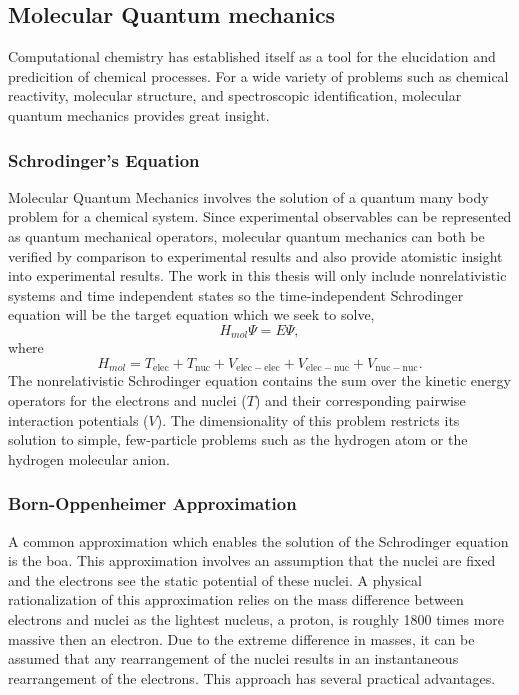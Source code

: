 \subsection{Molecular Quantum mechanics}
Computational chemistry has established itself as a tool for the elucidation and predicition of chemical processes.
For a wide variety of problems such as chemical reactivity, molecular structure, and spectroscopic identification, molecular quantum mechanics provides great insight.

\subsubsection{Schrodinger's Equation}
Molecular Quantum Mechanics  involves the solution of a quantum many body problem for a chemical system. Since experimental observables can be represented as quantum mechanical operators, molecular quantum mechanics can both be verified by comparison to experimental results and also provide atomistic insight into experimental results.
The work in this thesis will only include nonrelativistic systems and time independent states so the time-independent Schrodinger equation will be the target equation which we seek to solve,
\begin{equation}
H_{mol} \Psi = E \Psi,
\end{equation}
where
\begin{equation}
H_{mol} = T_{\mathrm{elec}} + T_{\mathrm{nuc}} + V_{\mathrm{elec-elec}} + V_{\mathrm{elec-nuc}} + V_{\mathrm{nuc-nuc}}.
\end{equation}
The nonrelativistic Schrodinger equation contains the sum over the kinetic energy operators for the electrons and nuclei ($T$) and their corresponding pairwise interaction potentials ($V$).
The dimensionality of this problem restricts its solution to simple, few-particle problems such as the hydrogen atom or the hydrogen molecular anion.

\subsubsection{Born-Oppenheimer Approximation}
A common approximation which enables the solution of the Schrodinger equation is the \gls{boa}.
This approximation involves an assumption that the nuclei are fixed and the electrons see the static potential of these nuclei.
A physical rationalization of this approximation relies on the mass difference between electrons and nuclei as the lightest nucleus, a proton, is roughly 1800 times more massive then an electron.
Due to the extreme difference in masses, it can be assumed that any rearrangement of the nuclei results in an instantaneous rearrangement of the electrons.
This approach has several practical advantages.

